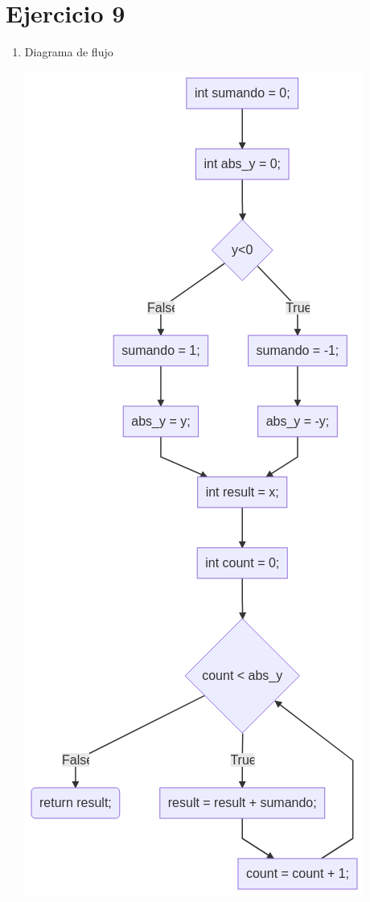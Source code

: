 \documentclass{article}
\begin{document}
\section*{Ejercicio 9}

\begin{enumerate}
    \item Diagrama de flujo
    
    \includegraphics[scale=0.65]{recursos/sumar.png}


\end{enumerate}
\end{document}
